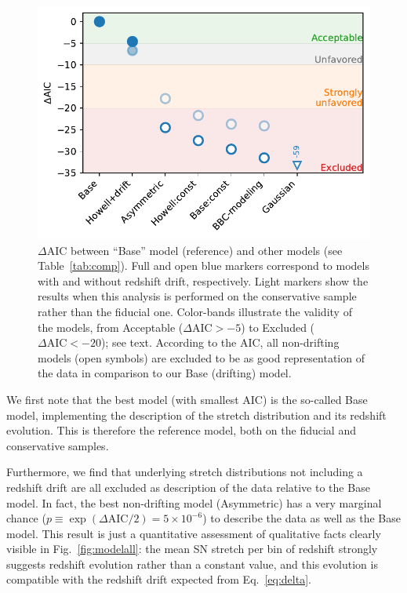 \documentclass[]{aa} %
\begin{document}
\begin{figure}
    \centering
    \includegraphics[width=\linewidth]{Article_figures/mod_comp.pdf}
    \caption{$\Delta$AIC between ``Base'' model (reference) and other models
        (see Table~\ref{tab:comp}). Full and open blue markers correspond to
        models with and without redshift drift, respectively. Light markers show
        the results when this analysis is performed on the conservative sample
        rather than the fiducial one.  Color-bands illustrate the validity of
        the models, from  Acceptable ($\Delta\mathrm{AIC} > -5$) to Excluded
        ($\Delta\mathrm{AIC} < -20$); see text. According to the AIC, all
    non-drifting models (open symbols) are excluded to be as good representation
of the data in comparison to our Base (drifting) model.}
    \label{fig:mod_comp}
\end{figure}

We first note that the best model (with smallest AIC) is the so-called Base
model, implementing the \cite{rigault2018} description of the stretch
distribution and its redshift evolution. This is therefore the reference model,
both on the fiducial and conservative samples.

Furthermore, we find that underlying stretch distributions not including a
redshift drift are all excluded as description of the data relative to the Base
model. In fact, the best non-drifting model (Asymmetric) has a very marginal
chance ($p \equiv \exp\left(\Delta\mathrm{AIC}/2\right) = 5\times10^{-6}$) to
describe the data as well as the Base model. This result is just a quantitative
assessment of qualitative facts clearly visible in Fig.~\ref{fig:modelall}: the
mean SN stretch per bin of redshift strongly suggests redshift evolution
rather than a constant value, and this evolution is compatible with the
redshift drift expected from Eq.~\ref{eq:delta}.
    
\end{document}
